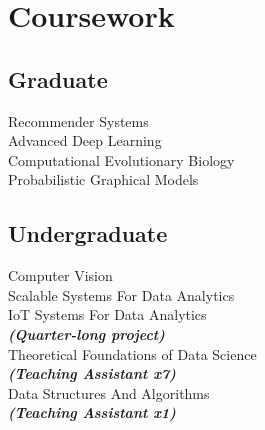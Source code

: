 \documentclass[]{deedy-resume-openfont}
\begin{document}
\begin{minipage}[t]{0.33\textwidth}




\section{Coursework}
\subsection{Graduate}
Recommender Systems\\
Advanced Deep Learning\\
Computational Evolutionary Biology\\
Probabilistic Graphical Models\\
\sectionsep

\subsection{Undergraduate}
Computer Vision\\
Scalable Systems For Data Analytics\\
IoT Systems For Data Analytics\\
{\footnotesize \textit{\textbf{(Quarter-long project) }}} \\
Theoretical Foundations of Data Science\\
{\footnotesize \textit{\textbf{(Teaching Assistant x7) }}} \\
Data Structures And Algorithms\\
{\footnotesize \textit{\textbf{(Teaching Assistant x1) }}} \\

%
%

\end{minipage}
\hfill
\end{document}
